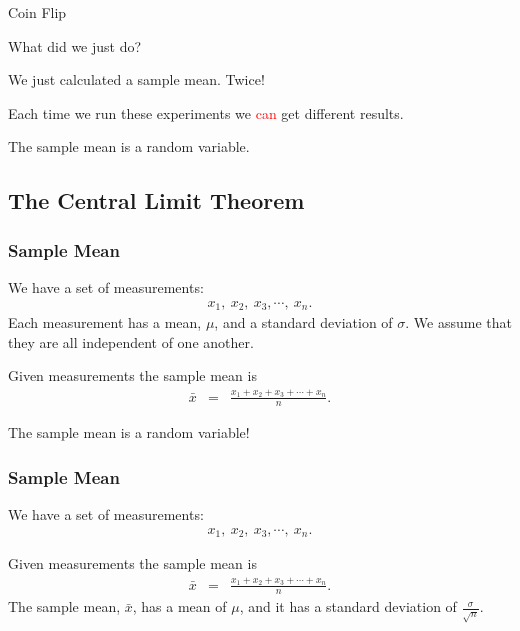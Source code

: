 \begin{frame}{Coin Flip}

What did we just do? 

  {
    We just calculated a sample mean. Twice!
  }

  { 

    Each time we run these experiments we \textcolor{red}{can} get
    different results.

    The sample mean is a random variable.
  }
  
\end{frame}

\subsection{The Central Limit Theorem}

\begin{frame}
  \frametitle{Sample Mean}

  We have a set of measurements:
  \begin{eqnarray*}
    x_1,~x_2,~x_3,\cdots,~x_n.
  \end{eqnarray*}
  Each measurement has a mean, $\mu$, and a standard deviation of
  $\sigma$. We assume that they are all independent of one another.
  
  {
    \begin{definition}
      Given measurements the sample mean is 
      \begin{eqnarray*}
        \bar{x} & = & \frac{x_1+x_2+x_3+\cdots+x_n}{n}.
      \end{eqnarray*}
    \end{definition}
  }

  {
    The sample mean is a random variable!
  }

\end{frame}


\begin{frame}
  \frametitle{Sample Mean}

  We have a set of measurements:
  \begin{eqnarray*}
    x_1,~x_2,~x_3,\cdots,~x_n.
  \end{eqnarray*}
  
  \begin{definition}
    Given measurements the sample mean is 
    \begin{eqnarray*}
      \bar{x} & = & \frac{x_1+x_2+x_3+\cdots+x_n}{n}.
    \end{eqnarray*}
    The sample mean, $\bar{x}$,  has a mean of $\mu$, and it has a
    standard deviation of $\frac{\sigma}{\sqrt{n}}$.
  \end{definition}

\end{frame}


